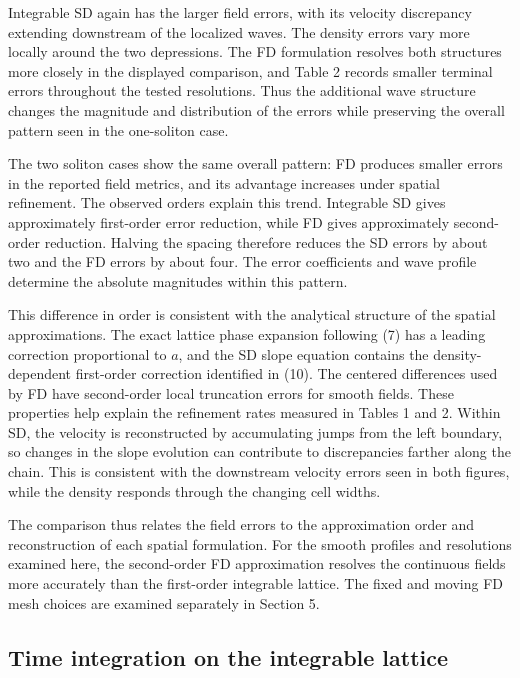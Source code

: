 \documentclass{article}
\begin{document}
Integrable SD again has the larger field errors, with its velocity discrepancy extending downstream of the localized waves. The density errors vary more locally around the two depressions. The FD formulation resolves both structures more closely in the displayed comparison, and Table 2 records smaller terminal errors throughout the tested resolutions. Thus the additional wave structure changes the magnitude and distribution of the errors while preserving the overall pattern seen in the one-soliton case.

The two soliton cases show the same overall pattern: FD produces smaller errors in the reported field metrics, and its advantage increases under spatial refinement. The observed orders explain this trend. Integrable SD gives approximately first-order error reduction, while FD gives approximately second-order reduction. Halving the spacing therefore reduces the SD errors by about two and the FD errors by about four. The error coefficients and wave profile determine the absolute magnitudes within this pattern.

This difference in order is consistent with the analytical structure of the spatial approximations. The exact lattice phase expansion following (7) has a leading correction proportional to \(a\), and the SD slope equation contains the density-dependent first-order correction identified in (10). The centered differences used by FD have second-order local truncation errors for smooth fields. These properties help explain the refinement rates measured in Tables 1 and 2. Within SD, the velocity is reconstructed by accumulating jumps from the left boundary, so changes in the slope evolution can contribute to discrepancies farther along the chain. This is consistent with the downstream velocity errors seen in both figures, while the density responds through the changing cell widths.

The comparison thus relates the field errors to the approximation order and reconstruction of each spatial formulation. For the smooth profiles and resolutions examined here, the second-order FD approximation resolves the continuous fields more accurately than the first-order integrable lattice. The fixed and moving FD mesh choices are examined separately in Section 5.


\subsection{Time integration on the integrable lattice}
\end{document}
